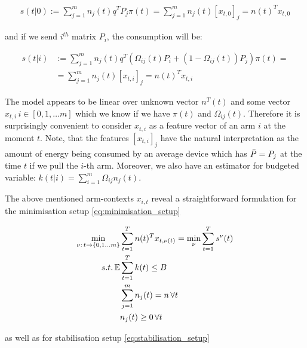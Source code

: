     \begin{equation}
    \label{eq:no_control_consumption}
    \begin{split}
        s(t|0) := \sum_{j=1}^{m}n_j(t)q^TP_j\pi(t) =  \sum_{j=1}^{m}n_j(t)[x_{t, 0}]_j = n(t)^Tx_{t, 0}
    \end{split}
    \end{equation}
    
    and if we send $i^{th}$ matrix $P_i$, the consumption will be:

    \begin{equation}
        \label{eq:arm_consumption}
    \begin{split}
        s(t|i) & := \sum_{j=1}^mn_j(t)q^T(\Omega_{ij}(t)P_i + (1-\Omega_{ij}(t))P_j)\pi(t) = \\& = \sum_{j=1}^{m}n_j(t)[x_{t, i}]_j = n(t)^Tx_{t, i}
    \end{split}
    \end{equation}
    
    The model appears to be linear over unknown vector $n^T(t)$ and some vector $x_{t, i}\, i \in [0, 1, \dots m]$ which we know if we have $\pi(t)$ and $\Omega_{ij}(t)$. Therefore it is surprisingly convenient to consider $x_{t, i}$ as a feature vector of an arm $i$ at the moment $t$. Note, that the features $[x_{t, i}]_j$ have the natural interpretation as the amount of energy being consumed by an average device which has ${\bar P} = P_j$ at the time $t$ if we pull the $i$-th arm. Moreover, we also have an estimator for budgeted variable: $k(t|i) = \sum_{i=1}^{m}\Omega_{ij}n_j(t)$.

The above mentioned arm-contexts $x_{i, t}$ reveal a straightforward formulation for the minimisation setup \ref{eq:minimisation_setup}

\begin{align}
    \label{eq:minimization_bandit_setup}
    \begin{split}    
    \min_{\nu:\, t \to \{0, 1\dots m\} }& \sum_{t=1}^Tn(t)^Tx_{t, \nu(t)} = \min_{\nu} \sum_{t=1}^Ts^\nu(t)\\
     s.t. \operatorname{\mathbb{E}}& \sum_{t=1}^T k(t) \leq B \\
     & \sum_{j=1}^m n_j(t) = n\, \forall t\\
     & n_j(t) \geq 0\, \forall t
     \end{split}
\end{align} 
 
as well as for stabilisation setup \ref{eq:stabilisation_setup}

